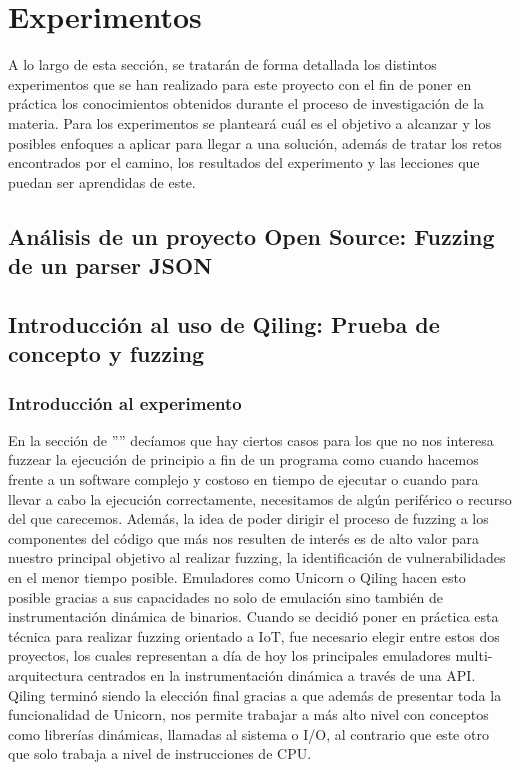 \chapter{Experimentos}
\label{experimentos}
A lo largo de esta sección, se tratarán de forma detallada los distintos experimentos que se han realizado para este proyecto con el fin de 
poner en práctica los conocimientos obtenidos durante el proceso de investigación de la materia. Para los experimentos se planteará cuál es el 
objetivo a alcanzar y los posibles enfoques a aplicar para llegar a una solución, además de tratar los retos encontrados por el camino, los 
resultados del experimento y las lecciones que puedan ser aprendidas de este.


\section{Análisis de un proyecto Open Source: Fuzzing de un parser JSON}


\section{Introducción al uso de Qiling: Prueba de concepto y fuzzing}
\subsection{Introducción al experimento}
En la sección de '''' decíamos que hay ciertos casos para los que no nos interesa fuzzear la ejecución de principio a fin 
de un programa como cuando hacemos frente a un software complejo y costoso en tiempo de ejecutar o cuando para llevar a cabo la ejecución correctamente, 
necesitamos de algún periférico o recurso del que carecemos. Además, la idea de poder dirigir el proceso de fuzzing a los componentes del código que más nos 
resulten de interés es de alto valor para nuestro principal objetivo al realizar fuzzing, la identificación de vulnerabilidades en el menor tiempo posible.
Emuladores como Unicorn o Qiling hacen esto posible gracias a sus capacidades no solo de emulación sino también de instrumentación dinámica de binarios.
Cuando se decidió poner en práctica esta técnica para realizar fuzzing orientado a IoT, fue necesario elegir entre estos dos proyectos, los cuales 
representan a día de hoy los principales emuladores multi-arquitectura centrados en la instrumentación dinámica a través de una API. Qiling terminó siendo 
la elección final gracias a que además de presentar toda la funcionalidad de Unicorn, nos permite trabajar a más alto nivel con conceptos como librerías dinámicas,
llamadas al sistema o I/O, al contrario que este otro que solo trabaja a nivel de instrucciones de CPU.\bigskip

